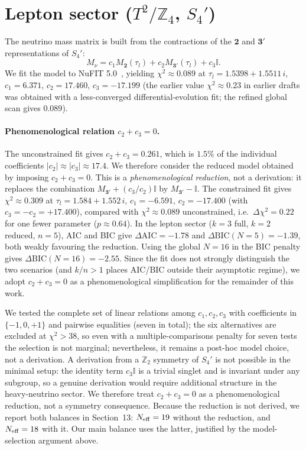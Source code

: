 \documentclass[12pt,a4paper]{article}
\numberwithin{equation}{section}
\begin{document}
\section{Lepton sector (\(T^2/\mathbb{Z}_4\), \(S_4'\))}
\label{sec:lepton}
The neutrino mass matrix is built from the contractions of the \(\mathbf{2}\) and \(\mathbf{3}'\) representations of \(S_4'\):
\begin{equation}
M_\nu = c_1 M_{\mathbf{2}}(\tau_l) + c_2 M_{\mathbf{3}'}(\tau_l) + c_3 \mathbb{I}.
\end{equation}
We fit the model to NuFIT 5.0~\cite{NuFIT2020}, yielding \(\chi^2 \approx 0.089\) at \(\tau_l = 1.5398 + 1.5511\,i\), \(c_1 = 6.371\), \(c_2 = 17.460\), \(c_3 = -17.199\) (the earlier value \(\chi^2 \approx 0.23\) in earlier drafts was obtained with a less-converged differential-evolution fit; the refined global scan gives \(0.089\)).

\paragraph{Phenomenological relation \(c_2 + c_3 = 0\).}
The unconstrained fit gives \(c_2 + c_3 = 0.261\), which is \(1.5\%\) of the individual coefficients \(|c_2| \approx |c_3| \approx 17.4\). We therefore consider the reduced model obtained by imposing \(c_2 + c_3 = 0\). This is a \emph{phenomenological reduction}, not a derivation: it replaces the combination \(M_{\mathbf 3'} + (c_3/c_2)\mathbb I\) by \(M_{\mathbf 3'} - \mathbb I\). The constrained fit gives \(\chi^2 \approx 0.309\) at \(\tau_l = 1.584 + 1.552\,i\), \(c_1 = -6.591\), \(c_2 = -17.400\) (with \(c_3 = -c_2 = +17.400\)), compared with \(\chi^2 \approx 0.089\) unconstrained, i.e.\ \(\Delta\chi^2 = 0.22\) for one fewer parameter (\(p \approx 0.64\)). In the lepton sector ($k=3$ full, $k=2$ reduced, $n=5$), AIC and BIC give \(\Delta\mathrm{AIC} = -1.78\) and \(\Delta\mathrm{BIC}(N{=}5) = -1.39\), both weakly favouring the reduction. Using the global \(N=16\) in the BIC penalty gives \(\Delta\mathrm{BIC}(N{=}16) = -2.55\). Since the fit does not strongly distinguish the two scenarios (and \(k/n > 1\) places AIC/BIC outside their asymptotic regime), we adopt \(c_2 + c_3 = 0\) as a phenomenological simplification for the remainder of this work.

We tested the complete set of linear relations among \(c_1, c_2, c_3\) with coefficients in \(\{-1,0,+1\}\) and pairwise equalities (seven in total); the six alternatives are excluded at \(\chi^2 > 38\), so even with a multiple-comparisons penalty for seven tests the selection is not marginal; nevertheless, it remains a post-hoc model choice, not a derivation. A derivation from a \(\mathbb Z_2\) symmetry of \(S_4'\) is not possible in the minimal setup: the identity term \(c_3\mathbb I\) is a trivial singlet and is invariant under any subgroup, so a genuine derivation would require additional structure in the heavy-neutrino sector. We therefore treat \(c_2 + c_3 = 0\) as a phenomenological reduction, not a symmetry consequence. Because the reduction is not derived, we report both balances in Section~13: \(N_{\rm eff} = 19\) without the reduction, and \(N_{\rm eff} = 18\) with it. Our main balance uses the latter, justified by the model-selection argument above.
\end{document}
